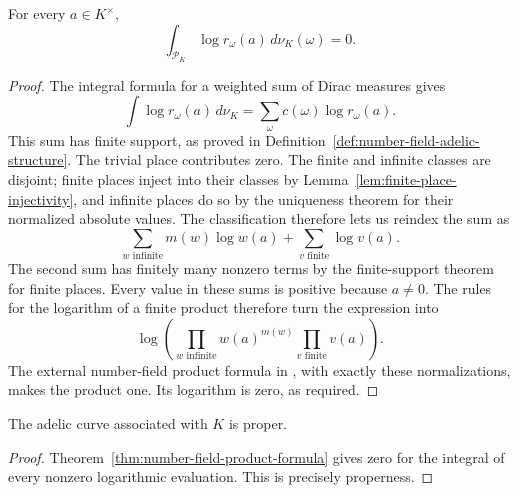 \begin{theorem}\label{thm:number-field-product-formula}
\leanok
{}
For every $a\in K^\times$,
\[
 \int_{\mathcal P_K}\log r_\omega(a)\,d\nu_K(\omega)=0.
\]
\end{theorem}
\begin{proof}
The integral formula for a weighted sum of Dirac measures gives
\[
 \int\log r_\omega(a)\,d\nu_K
 =\sum_\omega c(\omega)\log r_\omega(a).
\]
This sum has finite support, as proved in
Definition~\ref{def:number-field-adelic-structure}. The trivial place
contributes zero. The finite and infinite classes are disjoint; finite
places inject into their classes by Lemma~\ref{lem:finite-place-injectivity},
and infinite places do so by the uniqueness theorem for their normalized
absolute values. The classification therefore lets us reindex the sum as
\[
 \sum_{w\text{ infinite}}m(w)\log w(a)
 +\sum_{v\text{ finite}}\log v(a).
\]
The second sum has finitely many nonzero terms by the finite-support
theorem for finite places. Every value in these sums is positive because
$a\ne0$. The rules for the logarithm of a finite product therefore turn
the expression into
\[
 \log\left(
   \prod_{w\text{ infinite}}w(a)^{m(w)}
   \prod_{v\text{ finite}}v(a)\right).
\]
The external number-field product formula in
\cite{mathlib-number-fields}, with exactly these normalizations, makes
the product one. Its logarithm is zero, as required.
\end{proof}

\begin{corollary}\label{cor:number-field-proper}
\leanok
{}
The adelic curve associated with $K$ is proper.
\end{corollary}
\begin{proof}
Theorem~\ref{thm:number-field-product-formula} gives zero for the integral
of every nonzero logarithmic evaluation. This is precisely properness.
\end{proof}
